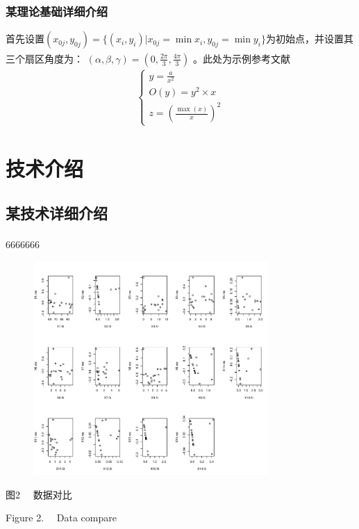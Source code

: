 \documentclass[UTF8,a4paper,12pt]{ctexart}
\begin{document}
	\subsubsection{某理论基础详细介绍}
	首先设置$(x_{0j},y_{0j}) = \{(x_i,y_i)|x_{0j}=\min x_i,y_{0j}=\min y_i\}$为初始点，并设置其三个扇区角度为：
	$(\alpha ,\beta ,\gamma) = (0,\frac{2\pi}{3} ,\frac{4\pi}{3} )$ 。此处为示例参考文献\textsuperscript{\cite{Ref1}}
	\begin{equation}
		\begin{array}{c}
			\text {}\left\{\begin{array}{l}
				y=\frac{a}{x^2}\\
				O(y) = y^2\times x\\
				z=(\frac{\max(x)}{x})^2
			\end{array}\right.
		\end{array}
	\end{equation}
	

	\section{技术介绍}
	\subsection{某技术详细介绍}
	6666666\textsuperscript{\cite{Ref2}}
	\begin{figure}[!h]
		\centering
		\includegraphics[width=0.8\textwidth]{pic/cti.pdf}
		\label{tu}
	\end{figure}
	\vspace{-0.5cm}
	\begin{center}
		\fontsize{10.5pt}{\baselineskip}\heiti 图2 \ \  数据对比 \par Figure 2. \ \ Data compare
	\end{center} 
	
\end{document}

